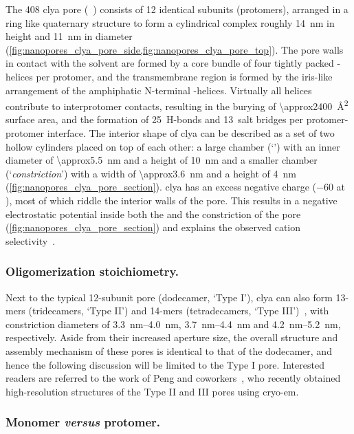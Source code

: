 The \SI{408}{\kDa} \gls{clya} pore (~\cite{Peng-2019}) consists of 12 identical subunits
(protomers), arranged in a ring like quaternary structure to form a cylindrical complex roughly \SI{14}{\nm}
in height and \SI{11}{\nm} in diameter (\cref{fig:nanopores_clya_pore_side,fig:nanopores_clya_pore_top}). The
pore walls in contact with the solvent are formed by a core bundle of four tightly packed \ta-helices per
protomer, and the transmembrane region is formed by the iris-like arrangement of the amphiphatic N-terminal
\ta-helices. Virtually all helices contribute to interprotomer contacts, resulting in the burying of
\SI{\approx2400}{\square\angstrom} surface area, and the formation of 25~H-bonds and 13~salt bridges per
protomer-protomer interface. The interior shape of \gls{clya} can be described as a set of two hollow
cylinders placed on top of each other: a large \cisi{} chamber (`\lumen{}') with an inner diameter of
\SI{\approx5.5}{\nm} and a height of \SI{10}{\nm} and a smaller \transi{} chamber (`\textit{constriction}')
with a width of \SI{\approx3.6}{\nm} and a height of \SI{4}{\nm} (\cref{fig:nanopores_clya_pore_section}).
\Gls{clya} has an excess negative charge (\SI{-60}{\ec} at ), most of which riddle the interior walls
of the pore. This results in a negative electrostatic potential inside both the \lumen{} and the constriction
of the pore (\cref{fig:nanopores_clya_pore_section}) and explains the observed cation
selectivity~\cite{Soskine-2012,Franceschini-2016}.

\subsubsection{Oligomerization stoichiometry.}
%

Next to the typical 12-subunit pore (dodecamer, `Type I'), \gls{clya} can also form 13-mers (tridecamers,
`Type II') and 14-mers (tetradecamers, `Type III')~\cite{Soskine-2013,Peng-2019}, with constriction diameters
of \SIrange{3.3}{4.0}{\nm}, \SIrange{3.7}{4.4}{\nm} and \SIrange{4.2}{5.2}{\nm}, respectively. Aside from
their increased aperture size, the overall structure and assembly mechanism of these pores is identical to
that of the dodecamer, and hence the following discussion will be limited to the Type I pore. Interested
readers are referred to the work of Peng and coworkers~\cite{Peng-2019}, who recently obtained high-resolution
structures of the Type II and III pores using \gls{cryo-em}.


\subsubsection{Monomer \textit{versus} protomer.}
%

